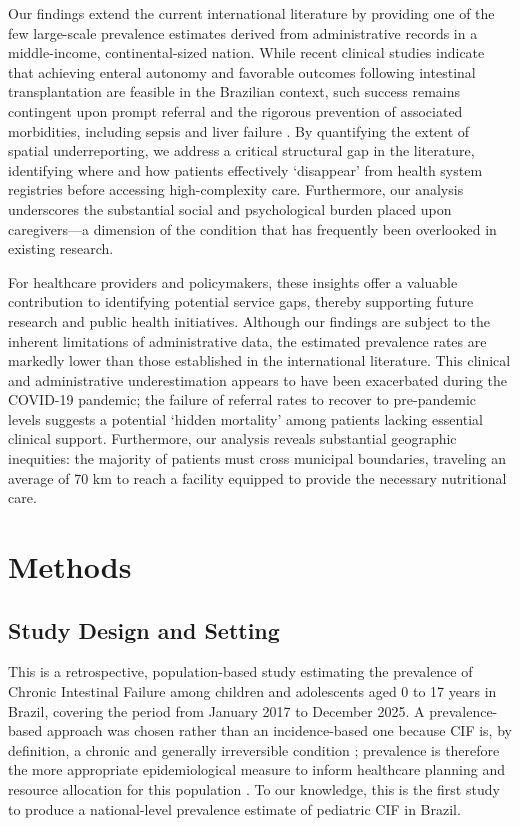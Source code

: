 \documentclass[pdflatex,sn-mathphys-num]{sn-jnl}
\theoremstyle{thmstyleone}%
\theoremstyle{thmstyletwo}%
\theoremstyle{thmstylethree}%
\begin{document}
Our findings extend the current international literature by providing one of the few large-scale prevalence estimates derived from administrative records in a middle-income, continental-sized nation. While recent clinical studies indicate that achieving enteral autonomy \cite{leite2025multicenter} and favorable outcomes following intestinal transplantation \cite{boteon2024multicentric} are feasible in the Brazilian context, such success remains contingent upon prompt referral and the rigorous prevention of associated morbidities, including sepsis and liver failure \cite{caporilli2023overview, elicit2025developing, cleminson2025gut}. By quantifying the extent of spatial underreporting, we address a critical structural gap in the literature, identifying where and how patients effectively ‘disappear’ from health system registries before accessing high-complexity care. Furthermore, our analysis underscores the substantial social and psychological burden placed upon caregivers—a dimension of the condition that has frequently been overlooked in existing research. \cite{feng2026quality}

For healthcare providers and policymakers, these insights offer a valuable contribution to identifying potential service gaps, thereby supporting future research and public health initiatives. Although our findings are subject to the inherent limitations of administrative data, the estimated prevalence rates are markedly lower than those established in the international literature.\cite{khokhar2025global} This clinical and administrative underestimation appears to have been exacerbated during the COVID-19 pandemic; the failure of referral rates to recover to pre-pandemic levels suggests a potential ‘hidden mortality’ among patients lacking essential clinical support. Furthermore, our analysis reveals substantial geographic inequities: the majority of patients must cross municipal boundaries, traveling an average of 70 km to reach a facility equipped to provide the necessary nutritional care.



\section{Methods}\label{sec2}

\subsection*{Study Design and Setting}

This is a retrospective, population-based study estimating the prevalence of Chronic Intestinal Failure among children and adolescents aged 0 to 17 years in Brazil, covering the period from January 2017 to December 2025. A prevalence-based approach was chosen rather than an incidence-based one because CIF is, by definition, a chronic and generally irreversible condition \cite{goulet2006causes}; prevalence is therefore the more appropriate epidemiological measure to inform healthcare planning and resource allocation for this population \cite{aspen2022pif}. To our knowledge, this is the first study to produce a national-level prevalence estimate of pediatric CIF in Brazil.
\end{document}
